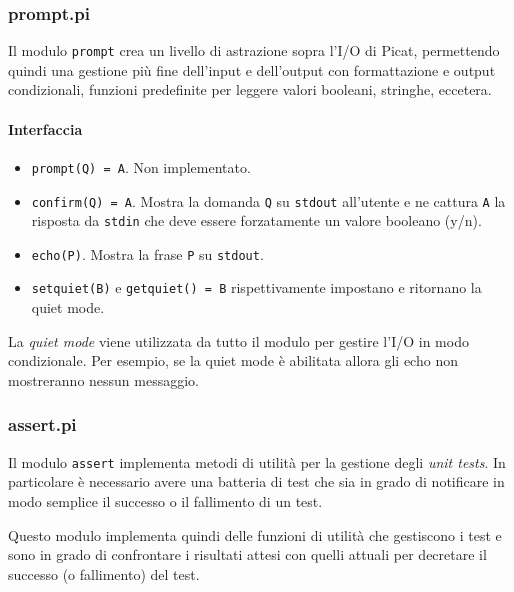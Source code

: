 \documentclass[12pt,a4paper,openright]{book} %
\begin{document}
\subsubsection{prompt.pi}

Il modulo \texttt{prompt} crea un livello di astrazione sopra l'I/O di
Picat, permettendo quindi una gestione più fine dell'input e
dell'output con formattazione e output condizionali, funzioni
predefinite per leggere valori booleani, stringhe, eccetera.

\paragraph{Interfaccia}

\begin{itemize}
	\item \texttt{prompt(Q) = A}. Non implementato.
	\item \texttt{confirm(Q) = A}. Mostra la domanda \texttt{Q} su
          \texttt{stdout} all'utente e ne cattura \texttt{A} la
          risposta da \texttt{stdin} che deve essere forzatamente un
          valore booleano (y/n).
	\item \texttt{echo(P)}. Mostra la frase \texttt{P} su
          \texttt{stdout}.
	\item \texttt{set\textunderscore quiet(B)} e
          \texttt{get\textunderscore quiet() = B} rispettivamente
          impostano e ritornano la quiet mode.
\end{itemize}

La \emph{quiet mode} viene utilizzata da tutto il modulo per gestire
l'I/O in modo condizionale. Per esempio, se la quiet mode è abilitata
allora gli echo non mostreranno nessun messaggio.

\subsubsection{assert.pi}

Il modulo \texttt{assert} implementa metodi di utilità per la gestione
degli \emph{unit tests}. In particolare è necessario avere una
batteria di test che sia in grado di notificare in modo semplice il
successo o il fallimento di un test.

Questo modulo implementa quindi delle funzioni di utilità che
gestiscono i test e sono in grado di confrontare i risultati attesi
con quelli attuali per decretare il successo (o fallimento) del test.
\end{document}
